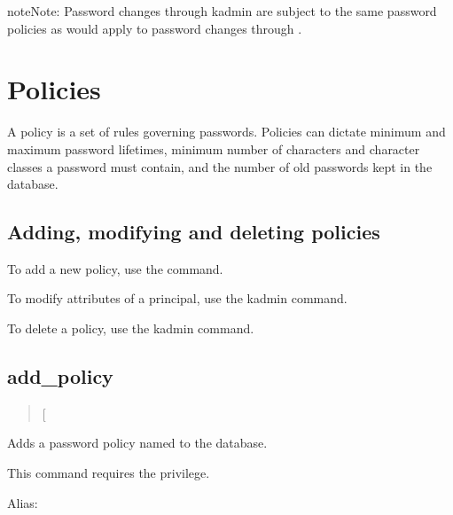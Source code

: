 \documentclass[letterpaper,10pt,english]{sphinxmanual}
\begin{document}
\begin{sphinxadmonition}{note}{Note:}
Password changes through kadmin are subject to the same
password policies as would apply to password changes through
.
\end{sphinxadmonition}


\section{Policies}
\label{\detokenize{admin/database:policies}}\label{\detokenize{admin/database:id1}}
A policy is a set of rules governing passwords.  Policies can dictate
minimum and maximum password lifetimes, minimum number of characters
and character classes a password must contain, and the number of old
passwords kept in the database.


\subsection{Adding, modifying and deleting policies}
\label{\detokenize{admin/database:adding-modifying-and-deleting-policies}}
To add a new policy, use the {\hyperref[\detokenize{admin/admin_commands/kadmin_local:kadmin-1}]{}}  command.

To modify attributes of a principal, use the kadmin 
command.

To delete a policy, use the kadmin  command.


\subsection{add\_policy}
\label{\detokenize{admin/database:add-policy}}\begin{quote}

 {[}\sphinxstyleemphasis{options}{]} 
\end{quote}

Adds a password policy named  to the database.

This command requires the  privilege.

Alias: 
\end{document}
